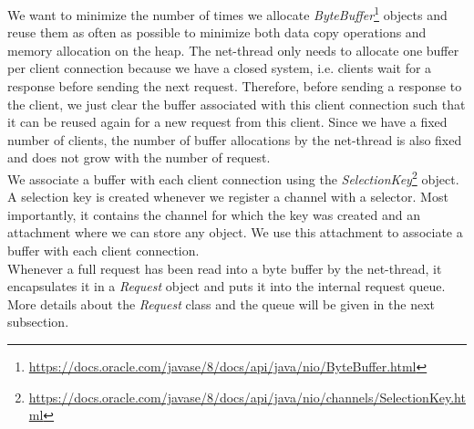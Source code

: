 We want to minimize the number of times we allocate \textit{ByteBuffer}\footnote{\url{https://docs.oracle.com/javase/8/docs/api/java/nio/ByteBuffer.html}} objects and reuse them as often as possible to minimize both data copy operations and memory allocation on the heap. The net-thread only needs to allocate one buffer per client connection because we have a closed system, i.e. clients wait for a response before sending the next request. Therefore, before sending a response to the client, we just clear the buffer associated with this client connection such that it can be reused again for a new request from this client. Since we have a fixed number of clients, the number of buffer allocations by the net-thread is also fixed and does not grow with the number of request. \\
We associate a buffer with each client connection using the \textit{SelectionKey}\footnote{\url{https://docs.oracle.com/javase/8/docs/api/java/nio/channels/SelectionKey.html}} object. A selection key is created whenever we register a channel with a selector. Most importantly, it contains the channel for which the key was created and an attachment where we can store any object. We use this attachment to associate a buffer with each client connection. \\

Whenever a full request has been read into a byte buffer by the net-thread, it encapsulates it in a \textit{Request} object and puts it into the internal request queue. More details about the \textit{Request} class and the queue will be given in the next subsection. 

